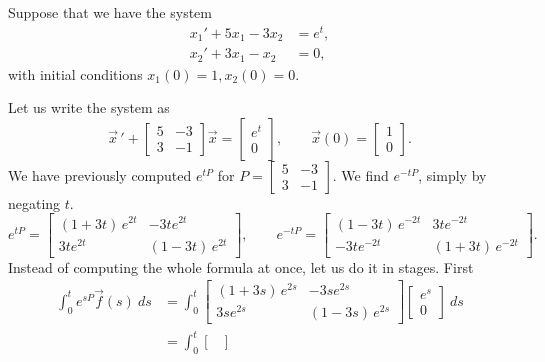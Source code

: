 \documentclass[12pt]{book}
\begin{document}
\begin{example}
Suppose that we have the system
\begin{align*}
x_1' + 5x_1 - 3x_2 &= e^t , \\
x_2' + 3x_1 - x_2 &= 0 ,
\end{align*}
with initial conditions $x_1(0) = 1, x_2(0) = 0$.

Let us write the system as
\begin{equation*}
{\vec{x}\,}' +
\begin{bmatrix} 5 & -3 \\ 3 & -1 \end{bmatrix}
\vec{x} =
\begin{bmatrix} e^t \\ 0 \end{bmatrix} ,
\qquad
\vec{x}(0) = 
\begin{bmatrix} 1 \\ 0 \end{bmatrix} .
\end{equation*}
We have previously computed $e^{tP}$ for
$P = \left[
\begin{smallmatrix} 5 & -3 \\ 3 & -1 \end{smallmatrix} \right]$.  We 
find
$e^{-tP}$, simply by negating $t$.
\begin{equation*}
e^{tP} = 
\begin{bmatrix}
(1+3t)\,e^{2t} & -3te^{2t} \\
3te^{2t} & (1-3t)\,e^{2t}
\end{bmatrix}
, \qquad
e^{-tP} = 
\begin{bmatrix}
(1-3t)\,e^{-2t} & 3te^{-2t} \\
-3te^{-2t} & (1+3t)\,e^{-2t}
\end{bmatrix}
.
\end{equation*}
Instead of computing the whole formula at once, let us do it in stages.
First
\begin{equation*}
\begin{split}
\int_0^t e^{sP}\vec{f}(s) ~ ds & = 
\int_0^t
 \begin{bmatrix}
 (1+3s)\,e^{2s} & -3se^{2s} \\
 3se^{2s} & (1-3s)\,e^{2s}
 \end{bmatrix}
 \begin{bmatrix} e^{s} \\ 0 \end{bmatrix}
~ ds
\\
& =
\int_0^t
 \begin{bmatrix}

\end{bmatrix}
\end{split}
\end{equation*}
\end{example}
\end{document}
